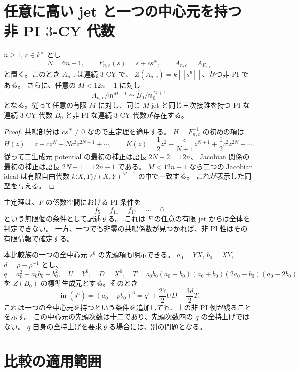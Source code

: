 \section{任意に高い jet と一つの中心元を持つ非 PI $3$-CY 代数}

\begin{corollary}
\label{cor:cy-pi-no-finite-determinacy-v22}
$n\ge1$, $c\in k^\times$ とし
\[
 N=6n-1,\qquad F_{n,c}(s)=s+cs^N,\qquad A_{n,c}=A_{F_{n,c}}
\]
と置く。このとき $A_{n,c}$ は連続 $3$-CY で、
$Z(A_{n,c})=k[[s^6]]$、かつ非 PI である。
さらに、任意の $M<12n-1$ に対し
\[
 A_{n,c}/\mathfrak m^{M+1}
 \simeq\widehat B_0/\mathfrak m_0^{M+1}
\]
となる。従って任意の有限 $M$ に対し、同じ $M$-jet と同じ三次接錐を持つ
PI な連続 $3$-CY 代数 $\widehat B_0$ と非 PI な連続 $3$-CY 代数が存在する。
\end{corollary}

\begin{proof}
共鳴部分は $cs^N\ne0$ なので主定理を適用する。
$H=F_{n,c}^{-1}$ の初めの項は
\[
 H(z)=z-cz^N+Nc^2z^{2N-1}+\cdots,
 \qquad
 K(z)=\frac12z^2-\frac{c}{N+1}z^{N+1}
       +\frac12c^2z^{2N}+\cdots.
\]
従って二生成元 potential の最初の補正は語長 $2N+2=12n$、
Jacobian 関係の最初の補正は語長 $2N+1=12n-1$ である。
$M<12n-1$ なら二つの Jacobian ideal は有限自由代数
$k\langle X,Y\rangle/(X,Y)^{M+1}$ の中で一致する。
これが表示した同型を与える。
\end{proof}

主定理は、$F$ の係数空間における PI 条件を
\[
 f_5=f_{11}=f_{17}=\cdots=0
\]
という無限個の条件として記述する。
これは $F$ の任意の有限 jet からは全体を判定できない。
一方、一つでも非零の共鳴係数が見つかれば、非 PI 性はその有限情報で確定する。

本比較族の一つの全中心元 $s^6$ の先頭項も明示できる。
$a_0=YX$, $b_0=XY$, $d=\rho-\rho^{-1}$ とし、
\[
 q=a_0^2-a_0b_0+b_0^2,\quad U=Y^6,\quad D=X^6,\quad
 T=a_0b_0(a_0-b_0)(a_0+b_0)(2a_0-b_0)(a_0-2b_0)
\]
を $Z(B_0)$ の標準生成元とする。そのとき
\begin{equation}
 \operatorname{in}(s^6)=(a_0-\rho b_0)^6
 =q^3+\frac{27}{2}UD-\frac{3d}{2}T.
 \label{eq:resonant-central-leading-v22}
\end{equation}
これは一つの全中心元を持つという条件を追加しても、上の非 PI 例が残ることを示す。
この中心元の先頭次数は十二であり、先頭次数四の $q$ の全持上げではない。
$q$ 自身の全持上げを要求する場合には、別の問題となる。

\section{比較の適用範囲}

